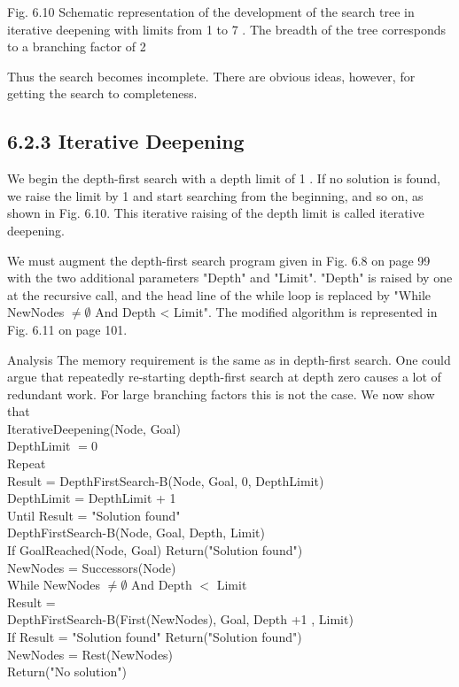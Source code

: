 \documentclass[10pt]{article}
\begin{document}
Fig. 6.10 Schematic representation of the development of the search tree in iterative deepening with limits from 1 to 7 . The breadth of the tree corresponds to a branching factor of 2

Thus the search becomes incomplete. There are obvious ideas, however, for getting the search to completeness.


\subsection*{6.2.3 Iterative Deepening}
We begin the depth-first search with a depth limit of 1 . If no solution is found, we raise the limit by 1 and start searching from the beginning, and so on, as shown in Fig. 6.10. This iterative raising of the depth limit is called iterative deepening.

We must augment the depth-first search program given in Fig. 6.8 on page 99 with the two additional parameters "Depth" and "Limit". "Depth" is raised by one at the recursive call, and the head line of the while loop is replaced by "While NewNodes $\neq \emptyset$ And Depth < Limit". The modified algorithm is represented in Fig. 6.11 on page 101.

Analysis The memory requirement is the same as in depth-first search. One could argue that repeatedly re-starting depth-first search at depth zero causes a lot of redundant work. For large branching factors this is not the case. We now show that\\
IterativeDeepening(Node, Goal)\\
DepthLimit $=0$\\
Repeat\\
Result = DepthFirstSearch-B(Node, Goal, 0, DepthLimit)\\
DepthLimit = DepthLimit + 1\\
Until Result = "Solution found"\\
DepthFirstSearch-B(Node, Goal, Depth, Limit)\\
If GoalReached(Node, Goal) Return("Solution found")\\
NewNodes = Successors(Node)\\
While NewNodes $\neq \emptyset$ And Depth $<$ Limit\\
Result =\\
DepthFirstSearch-B(First(NewNodes), Goal, Depth +1 , Limit)\\
If Result = "Solution found" Return("Solution found")\\
NewNodes = Rest(NewNodes)\\
Return("No solution")
\end{document}
